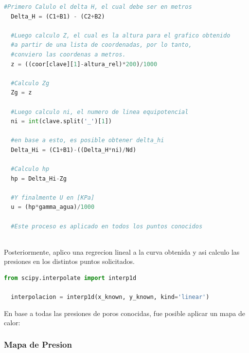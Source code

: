 \documentclass{article}
\begin{document}
\begin{lstlisting}[language=Python]
  #Primero Calulo el delta H, el cual debe ser en metros
  Delta_H = (C1+B1) - (C2+B2)

  #Luego calculo Z, el cual es la altura para el grafico obtenido
  #a partir de una lista de coordenadas, por lo tanto, 
  #conviero las coordenas a metros.
  z = ((coor[clave][1]-altura_rel)*200)/1000

  #Calculo Zg
  Zg = z

  #Luego calculo ni, el numero de linea equipotencial
  ni = int(clave.split('_')[1])

  #en base a esto, es posible obtener delta_hi
  Delta_Hi = (C1+B1)-((Delta_H*ni)/Nd)

  #Calculo hp
  hp = Delta_Hi-Zg

  #Y finalmente U en [KPa]
  u = (hp*gamma_agua)/1000
  
  #Este proceso es aplicado en todos los puntos conocidos
  
\end{lstlisting}

Posteriormente, aplico una regrecion lineal a la curva obtenida y asi calculo las presiones en los distintos puntos solicitados.

\begin{lstlisting}[language=Python]
  from scipy.interpolate import interp1d

  interpolacion = interp1d(x_known, y_known, kind='linear')
\end{lstlisting}

En base a todas las presiones de poros conocidas, fue posible aplicar un mapa de calor:

\subsubsection{Mapa de Presion}
\end{document}
